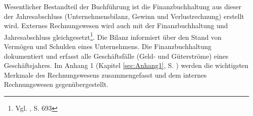 Wesentlicher Bestandteil der Buchführung ist die Finanzbuchhaltung aus dieser der Jahresabschluss (Unternehmensbilanz,  Gewinn und Verlustrechnung) erstellt wird. Externes Rechnungswesen wird auch mit der Finanzbuchhaltung und Jahresabschluss gleichgesetzt\footnote{Vgl. \cite{Wohe2000}, S. 693}. Die Bilanz informiert über den Stand von Vermögen und Schulden eines Unternehmens. Die Finanzbuchhaltung dokumentiert
und erfasst alle Geschäftsfälle (Geld- und Güterströme) eines Geschäftsjahres.
Im Anhang 1 (Kapitel \ref{sec:Anhang1}, S. \pageref{sec:Anhang1}) werden die wichtigsten Merkmale des Rechnungswesens zusammengefasst und dem internes Rechnungswesen gegenübergestellt.

%
